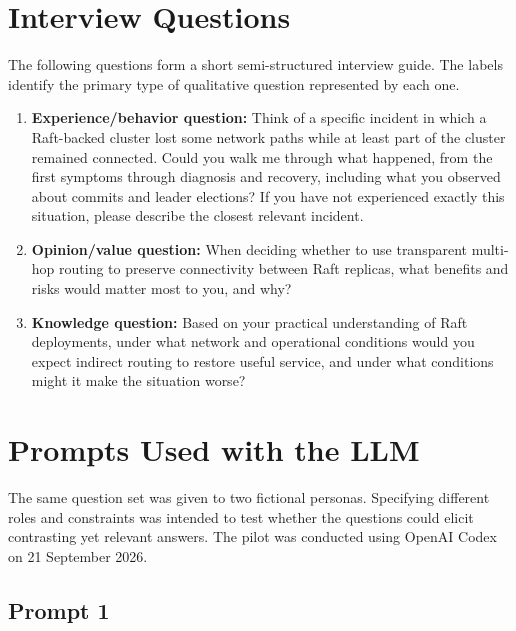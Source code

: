 \documentclass[11pt,a4paper]{article}
\begin{document}
\section{Interview Questions}

The following questions form a short semi-structured interview guide. The labels identify the primary type of qualitative question represented by each one.

\begin{enumerate}
  \item \textbf{Experience/behavior question:} Think of a specific incident in which a Raft-backed cluster lost some network paths while at least part of the cluster remained connected. Could you walk me through what happened, from the first symptoms through diagnosis and recovery, including what you observed about commits and leader elections? If you have not experienced exactly this situation, please describe the closest relevant incident.

  \item \textbf{Opinion/value question:} When deciding whether to use transparent multi-hop routing to preserve connectivity between Raft replicas, what benefits and risks would matter most to you, and why?

  \item \textbf{Knowledge question:} Based on your practical understanding of Raft deployments, under what network and operational conditions would you expect indirect routing to restore useful service, and under what conditions might it make the situation worse?
\end{enumerate}

\section{Prompts Used with the LLM}

The same question set was given to two fictional personas. Specifying different roles and constraints was intended to test whether the questions could elicit contrasting yet relevant answers. The pilot was conducted using OpenAI Codex on 21 September 2026.

\subsection{Prompt 1}
\end{document}
